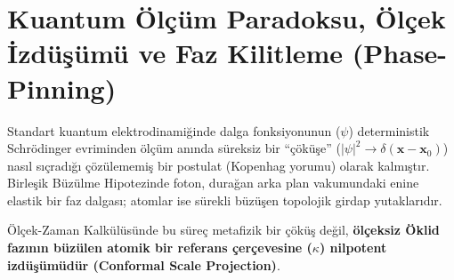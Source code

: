 \documentclass[11pt,a4paper]{article}
\begin{document}
\section{Kuantum Ölçüm Paradoksu, Ölçek İzdüşümü ve Faz Kilitleme (Phase-Pinning)}
\label{sec:kuantum_olcum_em}

Standart kuantum elektrodinamiğinde dalga fonksiyonunun ($\psi$) deterministik Schrödinger evriminden ölçüm anında süreksiz bir ``çöküşe'' ($|\psi|^2 \to \delta(\mathbf{x}-\mathbf{x}_0)$) nasıl sıçradığı çözülememiş bir postulat (Kopenhag yorumu) olarak kalmıştır. Birleşik Büzülme Hipotezinde foton, durağan arka plan vakumundaki enine elastik bir faz dalgası; atomlar ise sürekli büzüşen topolojik girdap yutaklarıdır.

Ölçek-Zaman Kalkülüsünde bu süreç metafizik bir çöküş değil, \textbf{ölçeksiz Öklid fazının büzülen atomik bir referans çerçevesine ($\kappa$) nilpotent izdüşümüdür (Conformal Scale Projection)}.
\end{document}
